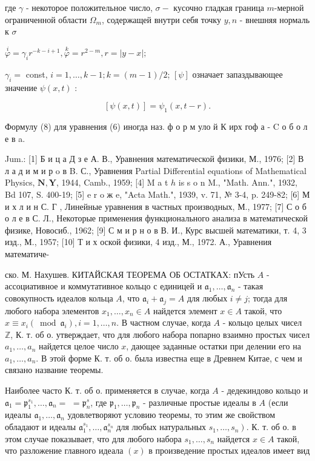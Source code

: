 \documentclass[10pt]{article}
\begin{document}
где $\gamma$ - некоторое положительное число, $\sigma-$ кусочно гладкая граница $m$-мерной ограниченной области $\Omega_{m}$, содержащей внутри себя точку $y, n$ - внешняя нормаль к $\sigma$



$\stackrel{i}{\varphi}=\gamma_{i} r^{-k-i+1}, \stackrel{k}{\varphi}=r^{2-m}, r=|y-x| ;$



$\gamma_{i}=$ const, $i=1, \ldots, k-1 ; k=(m-1) / 2$; $[\psi]$ означает запаздывающее значение $\psi(x, t)$ :



\[

[\psi(x, t)]=\psi_{1}(x, t-r) .

\]



Формулу (8) для уравнения (6) иногда наз. ф о р м уло й К ирх гоф а - C о б о л е в a.



Jum.: [1] Б и ц а Д з е А. В., Уравнения математической физики, М., 1976; [2] В л а д и м и р o в B. С., Уравнения Partial Differential equations of Mathematical Physics, $\mathbf{N}, \mathbf{Y}$, 1944, Camb., 1959; [4] M a t $h$ is s o n M., "Math. Ann.", 1932, Bd 107, S. 400-19; [5] e r o ж e, "Acta Math.", 1939, v. 71, № 3-4, p. 249-82; [6] М и х л и н С. Г , Линейные уравнения в частных производных, М., 1977; [7] С о б о л е в С. Л., Некоторые применения функционального анализа в математической физике, Новосиб., 1962; [9] С м и р н о в В. И., Курс высшей математики, т. 4, 3 изд., М., 1957; [10] Т и х оской физики, 4 изд., М., 1972. А., Уравнения математиче-

ско. М. Нахушев. КИТАЙСКАЯ ТЕОРЕМА ОБ ОСТАТКАХ: пУсть $A$ - ассоциативное и коммутативное кольцо с единицей и $\mathfrak{a}_{1}, \ldots, \mathfrak{a}_{n}$ - такая совокупность идеалов кольца $A$, что $\mathfrak{a}_{i}+\mathfrak{a}_{j}=A$ для любых $i \neq j$; тогда для любого набора элементов $x_{1}, \ldots, x_{n} \in A$ найдется элемент $x \in A$ такой, что $x \equiv x_{i}\left(\bmod \mathfrak{a}_{i}\right), i=1, \ldots, n$. В частном случае, когда $A$ - кольцо целых чисел $\mathbb{Z}$, К. т. об о. утверждает, что для любого набора попарно взаимно простых чисел $a_{1}, \ldots, a_{n}$ найдется целое число $x$, дающее заданные остатки при делении его на $a_{1}, \ldots, a_{n}$. В этой форме $К$. т. об о. была известна еще в Древнем Китае, с чем и связано название теоремы.



Наиболее часто К. т. об о. применяется в случае, когда $A$ - дедекиндово кольцо и $\mathfrak{a}_{1}=\mathfrak{p}_{1}^{s_{1}}, \ldots, \mathfrak{a}_{n}=$ $=\mathfrak{p}_{n}^{s}$, где $\mathfrak{p}_{1}, \ldots, \mathfrak{p}_{n}$ - различные простые идеалы в $A$ (если идеалы $\mathfrak{a}_{1}, \ldots, \mathfrak{a}_{n}$ удовлетворяют условию теоремы, то этим же свойством обладают и идеалы $\mathfrak{a}_{1}^{s_{1}}, \ldots, \mathfrak{a}_{n}^{s_{n}}$ для любых натуральных $\left.s_{1}, \ldots, s_{n}\right)$. К. т. об о. в этом случае показывает, что для любого набора $s_{1}, \ldots, s_{n}$ найдется $x \in A$ такой, что разложение главного идеала $(x)$ в произведение простых идеалов имеет вид
\end{document}
